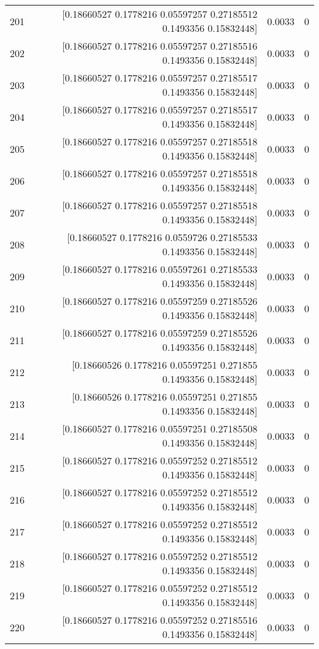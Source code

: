 \begin{longtable}{lrrr}
201 & [0.18660527 0.1778216  0.05597257 0.27185512 0.1493356  0.15832448] & 0.0033 & 0 \\
202 & [0.18660527 0.1778216  0.05597257 0.27185516 0.1493356  0.15832448] & 0.0033 & 0 \\
203 & [0.18660527 0.1778216  0.05597257 0.27185517 0.1493356  0.15832448] & 0.0033 & 0 \\
204 & [0.18660527 0.1778216  0.05597257 0.27185517 0.1493356  0.15832448] & 0.0033 & 0 \\
205 & [0.18660527 0.1778216  0.05597257 0.27185518 0.1493356  0.15832448] & 0.0033 & 0 \\
206 & [0.18660527 0.1778216  0.05597257 0.27185518 0.1493356  0.15832448] & 0.0033 & 0 \\
207 & [0.18660527 0.1778216  0.05597257 0.27185518 0.1493356  0.15832448] & 0.0033 & 0 \\
208 & [0.18660527 0.1778216  0.0559726  0.27185533 0.1493356  0.15832448] & 0.0033 & 0 \\
209 & [0.18660527 0.1778216  0.05597261 0.27185533 0.1493356  0.15832448] & 0.0033 & 0 \\
210 & [0.18660527 0.1778216  0.05597259 0.27185526 0.1493356  0.15832448] & 0.0033 & 0 \\
211 & [0.18660527 0.1778216  0.05597259 0.27185526 0.1493356  0.15832448] & 0.0033 & 0 \\
212 & [0.18660526 0.1778216  0.05597251 0.271855   0.1493356  0.15832448] & 0.0033 & 0 \\
213 & [0.18660526 0.1778216  0.05597251 0.271855   0.1493356  0.15832448] & 0.0033 & 0 \\
214 & [0.18660527 0.1778216  0.05597251 0.27185508 0.1493356  0.15832448] & 0.0033 & 0 \\
215 & [0.18660527 0.1778216  0.05597252 0.27185512 0.1493356  0.15832448] & 0.0033 & 0 \\
216 & [0.18660527 0.1778216  0.05597252 0.27185512 0.1493356  0.15832448] & 0.0033 & 0 \\
217 & [0.18660527 0.1778216  0.05597252 0.27185512 0.1493356  0.15832448] & 0.0033 & 0 \\
218 & [0.18660527 0.1778216  0.05597252 0.27185512 0.1493356  0.15832448] & 0.0033 & 0 \\
219 & [0.18660527 0.1778216  0.05597252 0.27185512 0.1493356  0.15832448] & 0.0033 & 0 \\
220 & [0.18660527 0.1778216  0.05597252 0.27185516 0.1493356  0.15832448] & 0.0033 & 0 \\

\end{longtable}
